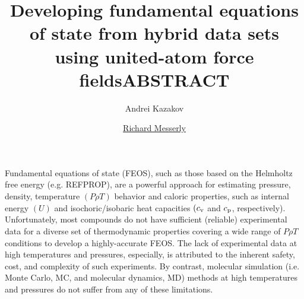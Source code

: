 \documentclass[11pt,a4paper]{article}
\begin{document}
	\thispagestyle{empty}
	\title{\Large \textbf{Developing fundamental equations of state from hybrid data sets using united-atom force fields}}
	\author[1]{\large {Andrei Kazakov}}
	\author[1]{\large {\underline{Richard Messerly}}}%
	
	
	\date{} %
	\maketitle\thispagestyle{empty} %
	\begin{center}
		\title{\textbf{ABSTRACT}}\centering{}
	\end{center}
	\justify
	
	
	
	Fundamental equations of state (FEOS), such as those based on the Helmholtz free energy (e.g. REFPROP), are a powerful approach for estimating pressure, density, temperature $(P\rho T)$ behavior and caloric properties, such as internal energy $(U)$ and isochoric/isobaric heat capacities $(c_{\rm v}$ and $c_{\rm p}$, respectively). Unfortunately, most compounds do not have sufficient (reliable) experimental data for a diverse set of thermodynamic properties covering a wide range of $P \rho T$ conditions to develop a highly-accurate FEOS. The lack of experimental data at high temperatures and pressures, especially, is attributed to the inherent safety, cost, and complexity of such experiments. By contrast, molecular simulation (i.e. Monte Carlo, MC, and molecular dynamics, MD) methods at high temperatures and pressures do not suffer from any of these limitations.
	
\end{document}
